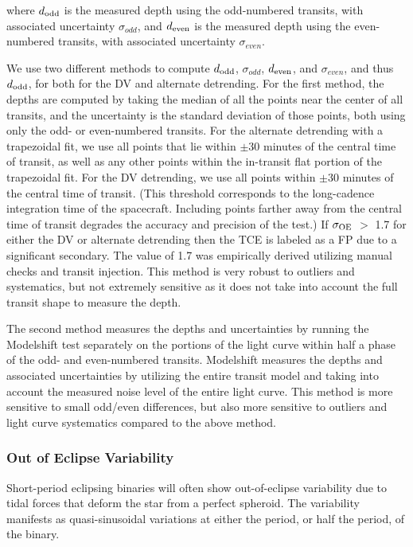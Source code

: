 where $d_{\rm odd}$ is the measured depth using the odd-numbered transits, with associated uncertainty $\sigma_{odd}$, and $d_{\rm even}$ is the measured depth using the even-numbered transits, with associated uncertainty $\sigma_{even}$.

We use two different methods to compute $d_{\rm odd}$, $\sigma_{odd}$, $d_{\rm even}$, and $\sigma_{even}$, and thus $d_{\rm odd}$, for both for the DV and alternate detrending. For the first method, the depths are computed by taking the median of all the points near the center of all transits, and the uncertainty is the standard deviation of those points, both using only the odd- or even-numbered transits. For the alternate detrending with a trapezoidal fit, we use all points that lie within $\pm$30 minutes of the central time of transit, as well as any other points within the in-transit flat portion of the trapezoidal fit. For the DV detrending, we use all points within $\pm$30 minutes of the central time of transit. (This threshold corresponds to the long-cadence integration time of the \kepler{} spacecraft. Including points farther away from the central time of transit degrades the accuracy and precision of the test.) If $\sigma_{\rm OE}$ $>$ 1.7 for either the DV or alternate detrending then the TCE is labeled as a FP due to a significant secondary. The value of 1.7 was empirically derived utilizing manual checks and transit injection. This method is very robust to outliers and systematics, but not extremely sensitive as it does not take into account the full transit shape to measure the depth.

The second method measures the depths and uncertainties by running the Modelshift test separately on the portions of the light curve within half a phase of the odd- and even-numbered transits. Modelshift measures the depths and associated uncertainties by utilizing the entire transit model and taking into account the measured noise level of the entire light curve. This method is more sensitive to small odd/even differences, but also more sensitive to outliers and light curve systematics compared to the above method.


\subsubsection{Out of Eclipse Variability}
\label{s:sweeteb}
Short-period eclipsing binaries will often show out-of-eclipse variability due to tidal forces that deform the star from a perfect spheroid. The variability manifests as quasi-sinusoidal variations at either the period, or half the period, of the binary.

